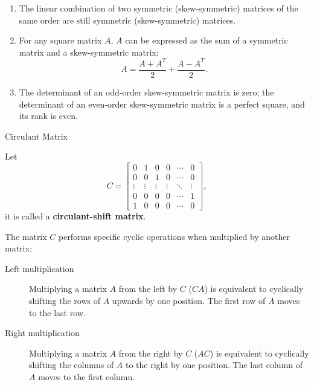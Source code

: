 \documentclass[11pt]{../../TexTemplate/elegantbook} %
\begin{document}
\begin{property}
    \begin{enumerate}
        \item The linear combination of two symmetric (skew-symmetric) matrices of the same order 
            are still symmetric (skew-symmetric) matrices. 
        \item For any square matrix \(A\), \(A\) can be expressed as the sum of 
            a symmetric matrix and a skew-symmetric matrix:
            \[
            A = \frac{A + A^T}{2} + \frac{A - A^T}{2}.
            \]
        \item The determinant of an odd-order skew-symmetric matrix is zero; 
            the determinant of an even-order skew-symmetric matrix is a perfect square,
            and its rank is even. 
    \end{enumerate}
\end{property}


\begin{leftbarTitle}{Circulant Matrix}\end{leftbarTitle}
Let 
\[
C = 
\begin{bmatrix} 
    0 & 1 & 0 & 0 & \cdots & 0 \\ 
    0 & 0 & 1 & 0 & \cdots & 0 \\ 
    \vdots & \vdots & \vdots & \vdots & \ddots & \vdots \\ 
    0 & 0 & 0 & 0 & \cdots & 1 \\
    1 & 0 & 0 & 0 & \cdots & 0
\end{bmatrix},
\]
it is called a \textbf{circulant-shift matrix}.

The matrix \(C\) performs specific cyclic operations when multiplied by another matrix:
\begin{description}
    \item [Left multiplication] Multiplying a matrix \(A\) from the left by \(C\) (\(CA\)) 
        is equivalent to cyclically shifting the rows of \(A\) upwards by one position. 
        The first row of \(A\) moves to the last row.
    \item [Right multiplication] Multiplying a matrix \(A\) from the right by \(C\) (\(AC\)) 
        is equivalent to cyclically shifting the columns of \(A\) to the right by one position. 
        The last column of \(A\) moves to the first column.
\end{description}
\end{document}
